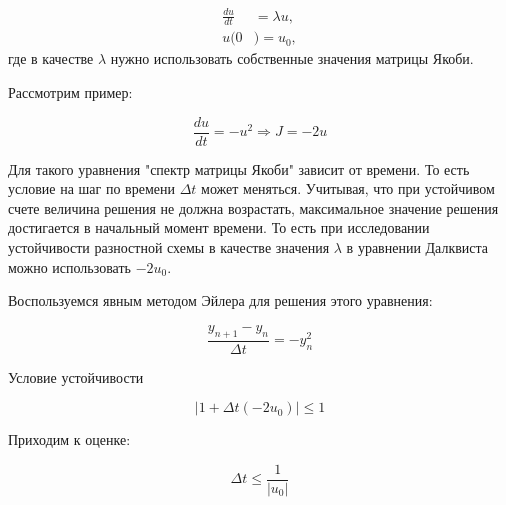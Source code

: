 \documentclass[10pt,a4paper]{article}
\begin{document}
	\begin{align}
		\frac{du}{dt} &= \lambda u,\\
		u(0&)=u_0,
	\end{align}
	где в качестве $\lambda$ нужно использовать собственные значения матрицы 
	Якоби.
	
	Рассмотрим пример:
	
	\begin{equation}
		\frac{du}{dt} = -u^{2} \Rightarrow J = -2u
	\end{equation}
	
	Для такого уравнения "спектр матрицы Якоби" зависит от времени. То есть 
	условие на шаг по времени $\Delta t$ может меняться. Учитывая, что при 
	устойчивом счете величина решения не должна возрастать, максимальное 
	значение решения достигается в начальный момент времени. То есть при 
	исследовании устойчивости разностной схемы в качестве значения $\lambda$ в 
	уравнении Далквиста можно использовать $-2 u_0$.  
	
	Воспользуемся явным методом Эйлера для решения этого уравнения:
	
	\begin{equation}
		\frac{y_{n + 1} - y_{n}}{\Delta t} = -y_{n}^{2}
	\end{equation}
	
	Условие устойчивости
	
	\begin{equation}
		\left|1 + \Delta t\left(-2u_0\right)\right| \leqslant 1
	\end{equation}
	
	Приходим к оценке:
	
	\begin{equation}
		\Delta t\leqslant 
		\frac{1}{\left|u_{0}\right|}
	\end{equation}
\end{document}
